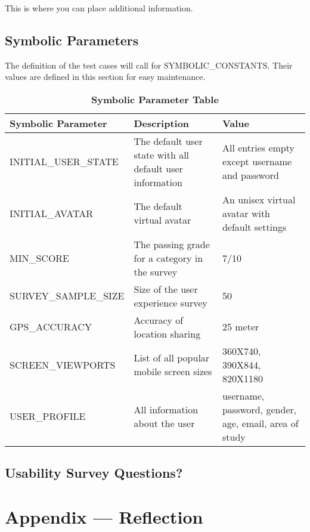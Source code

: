 \documentclass[12pt, titlepage]{article}
\begin{document}
This is where you can place additional information.

\subsection{Symbolic Parameters}

The definition of the test cases will call for SYMBOLIC\_CONSTANTS.
Their values are defined in this section for easy maintenance.

\begin{table}[h]
\caption{\bf Symbolic Parameter Table}
\begin{tabular}{|p{0.4\linewidth} | p{0.3\linewidth}| p{0.3\linewidth} |}
\hline
\multicolumn{1}{|l}{\bfseries Symbolic Parameter} & \multicolumn{1}{|l|}{\bfseries Description} & \multicolumn{1}{l|}{\bfseries Value}\\
\hline
INITIAL\_USER\_STATE & The default user state with all default user information & All entries empty except username and password \\
\hline
INITIAL\_AVATAR & The default virtual avatar & An unisex virtual avatar with default settings \\
\hline
MIN\_SCORE & The passing grade for a category in the survey & 7/10\\
\hline
SURVEY\_SAMPLE\_SIZE & Size of the user experience survey & 50\\
\hline
GPS\_ACCURACY & Accuracy of location sharing & 25 meter\\
\hline
SCREEN\_VIEWPORTS & List of all popular mobile screen sizes & 360X740, 390X844, 820X1180\\
\hline
USER\_PROFILE & All information about the user & username, password, gender, age, email, area of study\\
\hline
\end{tabular}
\end{table}

\subsection{Usability Survey Questions?}
\label{sec:survey}


\newpage{}
\section*{Appendix --- Reflection}
\end{document}
